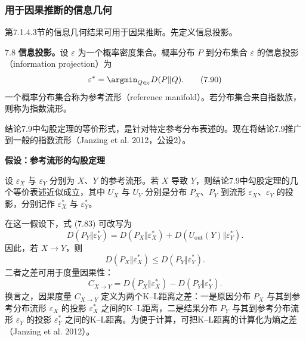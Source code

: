 \subsubsection{用于因果推断的信息几何}
第7.1.4.3节的信息几何结果可用于因果推断。先定义信息投影。

\begin{bookdefinition}{7.8}
\textbf{信息投影。}设 $\varepsilon$ 为一个概率密度集合。概率分布 $P$ 到分布集合 $\varepsilon$ 的信息投影（information projection）为
\begin{equation}
\varepsilon^*=\argmin_{Q\in\varepsilon}D(P\Vert Q).
\tag{7.90}
\end{equation}
一个概率分布集合称为参考流形（reference manifold）。若分布集合来自指数族，则称为指数流形。
\end{bookdefinition}

结论7.9中勾股定理的等价形式，是针对特定参考分布表述的。现在将结论7.9推广到一般的指数流形（Janzing et al. 2012，公设2）。

\par\medskip{}\noindent\textbf{假设：参考流形的勾股定理}\par
设 $\varepsilon_X$ 与 $\varepsilon_Y$ 分别为 $X$、$Y$ 的参考流形。若 $X$ 导致 $Y$，则结论7.9中勾股定理的几个等价表述近似成立，其中 $U_X$ 与 $U_Y$ 分别是分布 $P_X$、$P_Y$ 到流形 $\varepsilon_X$、$\varepsilon_Y$ 的投影，分别记作 $\varepsilon_X^*$ 与 $\varepsilon_Y^*$。

在这一假设下，式 (7.83) 可改写为
\begin{equation}
D(P_Y\Vert\varepsilon_Y^*)=D(P_X\Vert\varepsilon_X^*)
+D(U_{\mathrm{out}}(Y)\Vert\varepsilon_Y^*).
\tag{7.91}
\end{equation}
因此，若 $X\to Y$，则
\begin{equation}
D(P_X\Vert\varepsilon_X^*)\le D(P_Y\Vert\varepsilon_Y^*).
\tag{7.92}
\end{equation}
二者之差可用于度量因果性：
\begin{equation}
C_{X\to Y}=D(P_X\Vert\varepsilon_X^*)-D(P_Y\Vert\varepsilon_Y^*).
\tag{7.93}
\end{equation}
换言之，因果度量 $C_{X\to Y}$ 定义为两个K–L距离之差：一是原因分布 $P_X$ 与其到参考分布流形 $\varepsilon_X$ 的投影 $\varepsilon_X^*$ 之间的K–L距离，二是结果分布 $P_Y$ 与其到参考分布流形 $\varepsilon_Y$ 的投影 $\varepsilon_Y^*$ 之间的K–L距离。为便于计算，可把K–L距离的计算化为熵之差（Janzing et al. 2012）。

